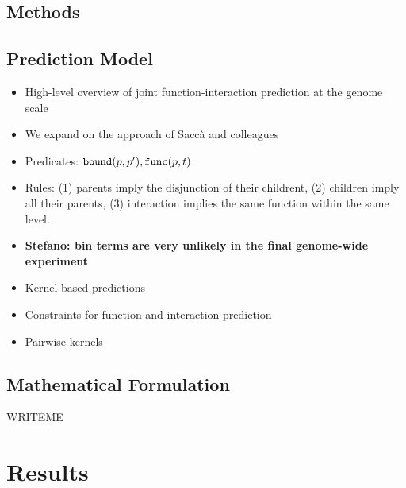 \documentclass{bioinfo}
\newcommand{\stefano}[1]{{\bf \textcolor{alizarin}{{Stefano: #1}}}}
\begin{document}
\begin{methods}

\section{Methods}

\subsection{Prediction Model}

\begin{itemize}

    \item High-level overview of joint function-interaction prediction at
    the genome scale

    \item We expand on the approach of Sacc\`a and colleagues~\cite{sacca2014ppisbr}

    \item Predicates: $\text{\texttt{bound}}(p,p'), \text{\texttt{func}}(p,t)$.

    \item Rules: (1) parents imply the disjunction of their childrent, (2)
    children imply all their parents, (3) interaction implies the same function
    within the same level.

    \item \stefano{bin terms are very unlikely in the final genome-wide
    experiment}

    \item Kernel-based predictions

    \item Constraints for function and interaction prediction

    \item Pairwise kernels

\end{itemize}

\subsection{Mathematical Formulation}

WRITEME

\end{methods}



\section{Results}
\end{document}

